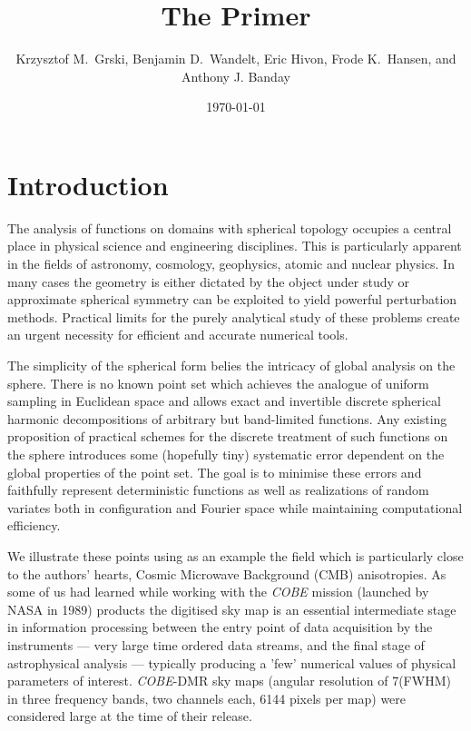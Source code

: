 \documentclass[12pt,twoside]{article}
\begin{document}
\title{The \healpix Primer}
\author{Krzysztof M.~G{\oacute}rski, Benjamin D.~Wandelt, Eric Hivon, Frode K.~Hansen,
and Anthony J. Banday}
%
\date{\today}

\frontpage
\tableofcontents
\newpage

\section{Introduction}

The analysis of functions on  domains with spherical topology occupies a
central place in physical science and engineering disciplines. 
This is particularly apparent in the fields of astronomy, cosmology, 
geophysics,  atomic and nuclear physics. In many cases the geometry is either
dictated by the object under study or approximate spherical symmetry can be
exploited to yield powerful perturbation methods. Practical
limits for the purely analytical study of these problems create
an urgent necessity for efficient and accurate numerical tools.

The 
simplicity of the spherical form belies the intricacy of global
analysis on the sphere. There is no known
point set which achieves the analogue of uniform sampling in Euclidean space and
allows exact and invertible discrete spherical harmonic decompositions
of arbitrary but band-limited functions. Any existing proposition of practical
schemes for the  discrete treatment of such functions 
on the sphere  introduces some (hopefully tiny) 
systematic error dependent on the global properties of
the point set. The goal is to minimise these errors and
faithfully represent deterministic functions as well as realizations of
random variates both
in configuration and Fourier space while maintaining computational efficiency.

We illustrate these points using as an example the field which is particularly 
close to the authors' hearts, Cosmic Microwave Background (CMB)
anisotropies. 
As some of us had learned while working with the {\it COBE} mission (launched by NASA in 1989) products
the digitised
sky map is an essential intermediate 
stage in information processing between 
the entry point of data acquisition by the 
instruments --- very large time ordered data streams,
and the final stage of astrophysical analysis --- 
typically producing a 
'few'
 numerical values
of physical parameters of interest. 
{\it COBE}-DMR sky maps (angular resolution of 7\degr (FWHM) in
three frequency bands, two channels each, 6144 pixels per map)
were considered large at the time of their release.
\end{document}
